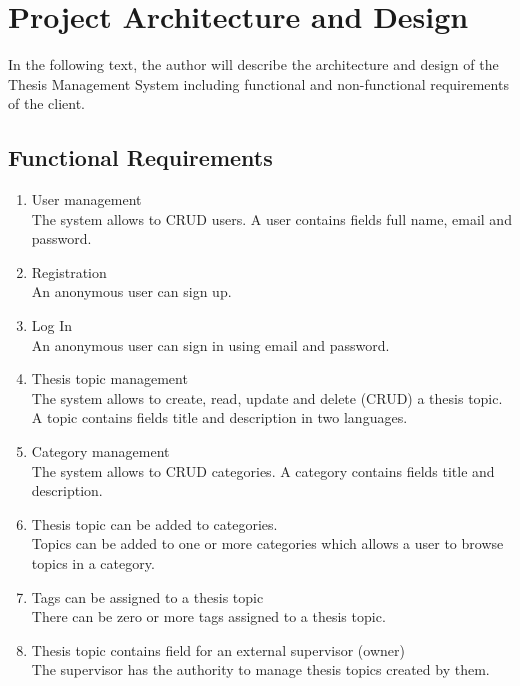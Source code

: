 \chapter{Project Architecture and Design}

In the following text, the author will describe the architecture and design of the Thesis Management System including functional and non-functional requirements of the client.

\section{Functional Requirements}

\begin{enumerate}
    \item User management\\
    The system allows to CRUD users. A user contains fields full name, email and password.

    \item Registration\\
    An anonymous user can sign up.

    \item Log In\\
    An anonymous user can sign in using email and password.

    \item Thesis topic management\\
    The system allows to create, read, update and delete (CRUD) a thesis topic. A topic contains fields title and description in two languages.

    \item Category management\\
    The system allows to CRUD categories. A category contains fields title and description.

    \item Thesis topic can be added to categories.\\
    Topics can be added to one or more categories which allows a user to browse topics in a category.

    \item Tags can be assigned to a thesis topic\\
    There can be zero or more tags assigned to a thesis topic.

    \item Thesis topic contains field for an external supervisor (owner)\\
    The supervisor has the authority to manage thesis topics created by them.


\end{enumerate}
